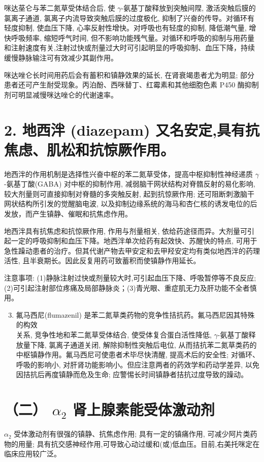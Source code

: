 \documentclass[10pt]{article}
\begin{document}
咪达莝仑与苯二氮草受体结合后, 使 $\gamma$-氨基丁酸释放到突触间陧, 激活突触后膜的氯离子通道, 氯离子内流导致突触后膜的过度极化, 抑制了兴奋的传导。对循环有轻度抑制, 使血压下降, 心率反射性增快。对呼吸也有轻度的抑制, 降低潮气量, 增快呼吸频率, 缩短呼气时间, 但不影响功能残气量。对循环和呼吸的抑制与用药量和注射速度有关,注射过快或剂量过大时可引起明显的呼吸抑制、血压下降，持续缓慢静脉输注可有效减少其副作用。

咪达唑仑长时间用药后会有蓄积和镇静效果的延长, 在肾衰竭患者尤为明显; 部分患者还可产生耐受现象。丙泊酚、西咪替丁、红霉素和其他细胞色素 P450 酶抑制剂可明显减慢咪达唑仑的代谢速率。

\section*{2. 地西泮 (diazepam) 又名安定,具有抗焦虑、肌松和抗惊厥作用。}
地西泮的作用机制是选择性兴奋中枢的苯二氮草受体，提高中枢抑制性神经递质 $\gamma$-氨基丁酸(GABA) 对中枢的抑制作用, 减弱脑干网状结构对脊䯝反射的易化影响, 较大剂量则可直接抑制对脊髓的多突触反射, 起到抗惊厥作用; 还可阻断刺激脑干网状结构所引发的觉醒脑电波, 以及抑制边缘系统的海马和杏仁核的诱发电位的后发放，而产生镇静、催眠和抗焦虑作用。

地西泮具有抗焦虑和抗惊厥作用, 作用与剂量相关, 依给药途径而异。大剂量可引起一定的呼吸抑制和血压下降。地西泮单次给药有起效快、苏醒快的特点, 可用于急性躁动患者的治疗。但其代谢产物去甲安定和去甲羟安定均有类似地西泮的药理活性, 且半衰期长。因此反复用药可致蓄积而使镇静作用延长。

注意事项: (1)静脉注射过快或剂量较大时,可引起血压下降、呼吸暂停等不良反应; (2)可引起注射部位疼痛及局部静脉炎；(3)青光眼、重症肌无力及肝功能不全者慎用。

\begin{enumerate}
  \setcounter{enumi}{2}
  \item 氟马西尼(flumazenil) 是苯二氮草类药物的竞争性拮抗药。氟马西尼因其特殊的构效\\
关系, 竞争性地和苯二氮草受体结合, 使受体复合蛋白活性降低, $\gamma$-氨基丁酸释放量下降, 氯离子通道关闭, 解除抑制性突触后电位, 从而拮抗苯二氮草类药的中枢镇静作用。氟马西尼可使患者术毕尽快清醒, 提高术后的安全性; 对循环、呼吸的影响小, 对肝肾功能影响小。但应注意两者的药效学和药动学差异, 以免因拮抗后再度镇静而危及生命; 应警惕长时间镇静者拮抗过度导致的躁动。
\end{enumerate}

\section*{（二） $\alpha_{2}$ 肾上腺素能受体激动剂}
$\alpha_{2}$ 受体激动剂有很强的镇静、抗焦虑作用; 具有一定的镇痛作用, 可减少阿片类药物的用量; 具有抗交感神经作用,可导致心动过缓和(或)低血压。目前,右美托咪定在临床应用较广泛。
\end{document}
